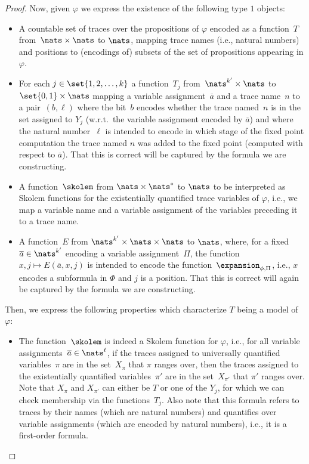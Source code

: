\begin{proof}
Now, given $\varphi$ we express the existence of the following type $1$ objects:
\begin{itemize}

    \item A countable set of traces over the propositions of $\varphi$ encoded as a function~$T$ from~$\nats \times \nats$ to $\nats$, mapping trace names (i.e., natural numbers) and positions to (encodings of) subsets of the set of propositions appearing in $\varphi$.

    \item For each $j \in \set{1,2,\ldots, k}$ a function~$T_j$ from~$\nats^{k'} \times \nats$ to $\set{0,1} \times \nats$ mapping a variable assignment~$\overline{a}$ and a trace name~$n$ to a pair~$(b,\ell)$ where the bit~$b$ encodes whether the trace named~$n$ is in the set assigned to $Y_j$ (w.r.t.\ the variable assignment encoded by $\overline{a}$) and where the natural number~$\ell$ is intended to encode in which stage of the fixed point computation the trace named $n$ was added to the fixed point (computed with respect to $\overline{a}$). That this is correct will be captured by the formula we are constructing.
 
    \item A function~$\skolem$ from $\nats \times \nats^*$
      to $\nats$ to be interpreted as Skolem functions for the existentially quantified trace variables of $\varphi$, i.e., we map a variable name and a variable assignment of the variables preceding it to a trace name. 

	\item A function~$E$ from $\nats^{k'} \times \nats \times \nats$ to $\nats$, where, for a fixed~$\overline{a} \in\nats^{k'}$ encoding a variable assignment~$\Pi$, the function~$x,j\mapsto E(\overline{a}, x, j)$ is intended to encode the function~$\expansion_{\phi,\Pi}$, i.e., $x$ encodes a subformula in $\Phi$ and $j$ is a position. That this is correct will again be captured by the formula we are constructing.
\end{itemize}

Then, we express the following properties which characterize $T$ being a model of $\varphi$:
\begin{itemize}

    \item The function~$\skolem$ is indeed a Skolem function for $\varphi$, i.e., for all variable assignments~$\overline{a} \in \nats^\ell$, if the traces assigned to universally quantified variables~$\pi$ are in the set~$X_\pi$ that $\pi$ ranges over, then the traces assigned to the existentially quantified variables~$\pi'$ are in the set~$X_{\pi'}$ that $\pi'$ ranges over. Note that $X_{\pi}$ and $X_{\pi'}$ can either be $T$ or one of the $Y_j$, for which we can check membership via the functions~$T_j$. Also note that this formula refers to traces by their names (which are natural numbers) and quantifies over variable assignments (which are encoded by natural numbers), i.e., it is a first-order formula.
    

\end{itemize}
\end{proof}
